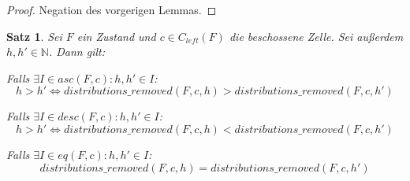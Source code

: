 \documentclass[a4paper,12pt]{llncs}
\newcommand{\N}{{\mathbb{N}}}
\numberwithin{equation}{section}
\newtheorem{satz}{Satz}
\begin{document}
\begin{proof}
Negation des vorgerigen Lemmas.
\end{proof}

\begin{satz}
Sei $F$ ein Zustand und $c \in C_{left}(F)$ die beschossene Zelle.
Sei außerdem $h,h' \in \N$.
Dann gilt:

Falls $\exists I \in asc(F, c) \colon h,h' \in I$:
\[
h > h' \Leftrightarrow distributions\_removed(F,c, h) > distributions\_removed(F,c, h')
\]

Falls $\exists I \in desc(F, c) \colon h,h' \in I$:
\[
h > h' \Leftrightarrow distributions\_removed(F,c, h) < distributions\_removed(F,c, h')
\]

Falls $\exists I \in eq(F, c) \colon h,h' \in I$:
\[
distributions\_removed(F,c, h) = distributions\_removed(F,c, h')
\]
\end{satz}
\end{document}
